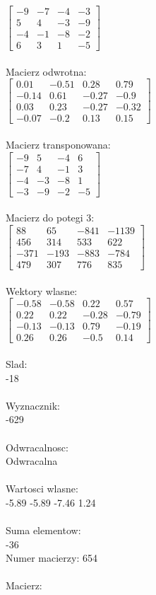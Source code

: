 \documentclass[a4paper,12pt]{article}
\begin{document}
$\begin{bmatrix} -9&-7&-4&-3\\5&4&-3&-9\\-4&-1&-8&-2\\6&3&1&-5 \end{bmatrix}$
\\
\\
Macierz odwrotna:\\

$\begin{bmatrix} 0.01&-0.51&0.28&0.79\\-0.14&0.61&-0.27&-0.9\\0.03&0.23&-0.27&-0.32\\-0.07&-0.2&0.13&0.15 \end{bmatrix}$
\\
\\
Macierz transponowana:\\

$\begin{bmatrix} -9&5&-4&6\\-7&4&-1&3\\-4&-3&-8&1\\-3&-9&-2&-5 \end{bmatrix}$
\\
\\
Macierz do potegi 3:\\

$\begin{bmatrix} 88&65&-841&-1139\\456&314&533&622\\-371&-193&-883&-784\\479&307&776&835 \end{bmatrix}$
\\
\\
Wektory wlasne:\\

$\begin{bmatrix} -0.58&-0.58&0.22&0.57\\0.22&0.22&-0.28&-0.79\\-0.13&-0.13&0.79&-0.19\\0.26&0.26&-0.5&0.14 \end{bmatrix}$
\\
\\
Slad:\\
-18
\\
\\
Wyznacznik:\\
-629
\\
\\
Odwracalnosc:\\
Odwracalna
\\
\\
Wartosci wlasne:\\
-5.89 -5.89 -7.46 1.24
\\
\\
Suma elementow:\\
-36
\\
\newpage
Numer macierzy:
654
\\
\\
Macierz:\\
\end{document}
